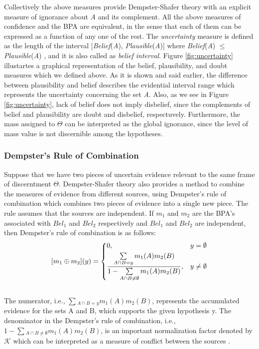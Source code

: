 \documentclass[11pt]{article}
\begin{document}
Collectively the above measures provide Dempster-Shafer theory with an explicit
measure of ignorance about \textit{A} and its complement. All the above measures
of confidence and the BPA are equivalent, in the sense that each of them can be
expressed as a function of any one of the rest. The \textit{uncertainty}
measure is defined as the length of the interval [\textit{Belief}(\textit{A}),
\textit{Plausible}(\textit{A})] where \textit{Belief}(\textit{A}) $\leqslant$
\textit{Plausible}(\textit{A}) \cite{yager:dst-combination-rules}, and it is
also called as \textit{belief interval}. Figure \ref{fig:uncertainty}
illustartes a graphical representation of the belief, plausibility, and doubt
measures which we defined above. As it is shown and said earlier, the difference
between plausibility and belief describes the evidential interval range which
represents the uncertainty concerning the set \textit{A}. Also, as we see in
Figure \ref{fig:uncertainty}, lack of belief does not imply disbelief, since the
complements of belief and plausibility are doubt and disbelief, respectuvely.
Furthermore, the mass assigned to $\Theta$ can be interpreted as the global
ignorance, since the level of mass value is not discernible among the
hypotheses.

\subsubsection{Dempster's Rule of Combination}

Suppose that we have two pieces of uncertain evidence relevant to the same frame of
discerntment $\Theta$. Dempster-Shafer theory also provides a method to combine
the measures of evidence from different sources, using Dempster's rule of
combination which combines two pieces of evidence into a single new piece. The
rule assumes that the sources are independent. If $m_1$ and $m_2$ are the BPA's
associated with $Bel_1$ and $Bel_2$ respectively and $Bel_1$ and $Bel_2$ are
independent, then Dempster's rule of combination is as follows:\\

\[
	[m_1 \oplus m_2](y) = 
    \begin{dcases}
      0, & y = \emptyset \\
      \frac{\sum\limits_{A \cap B = y}m_1(A)m_2(B)}{1-\sum\limits_{A
      \cap B \neq \emptyset}m_1(A)m_2(B)}, & y
      \neq
      \emptyset
	\end{dcases}
\]\\

\noindent The numerator, i.e., $\sum\limits{_{A \cap B =y}}m_1(A)m_2(B)$,
represents the accumulated evidence for the sets A and B, which supports the
given hypothesis y. The denominator in the Dempster's rule of combination, i.e.,
$1-\sum\limits{_{A \cap B \neq \emptyset}}m_1(A)m_2(B)$, is an important
normalization factor denoted by $\mathcal{K}$ which can be interpreted as a
measure of conflict between the sources
\cite{srivastava:evidential-reasoning-uncertainty}.
\end{document}
